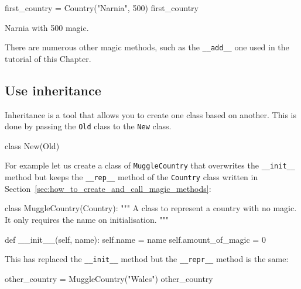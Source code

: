 \begin{pyin}
first_country = Country("Narnia", 500)
first_country
\end{pyin}





\begin{raw}
Narnia with 500 magic.
\end{raw}





There are numerous other magic methods, such as the \texttt{\_\_add\_\_} one used in
the tutorial of this Chapter.


\subsection{Use inheritance}
\label{sec:how_to_use_inheritance}

Inheritance is a tool that allows you to create one class based on another. This
is done by passing the \texttt{Old} class to the \texttt{New} class.


\begin{api}
class New(Old)
\end{api}



For example let us create a class of \texttt{MuggleCountry} that overwrites the
\texttt{\_\_init\_\_} method but keeps the \texttt{\_\_rep\_\_} method of the
\texttt{Country} class written
in Section~\ref{sec:how_to_create_and_call_magic_methods}:




\begin{pyin}
class MuggleCountry(Country):
    """
    A class to represent a country with no magic. It only requires the name on
    initialisation.
    """

    def __init__(self, name):
        self.name = name
        self.amount_of_magic = 0
\end{pyin}





This has replaced the \texttt{\_\_init\_\_} method but the \texttt{\_\_repr\_\_} method is the same:




\begin{pyin}
other_country = MuggleCountry("Wales")
other_country
\end{pyin}





